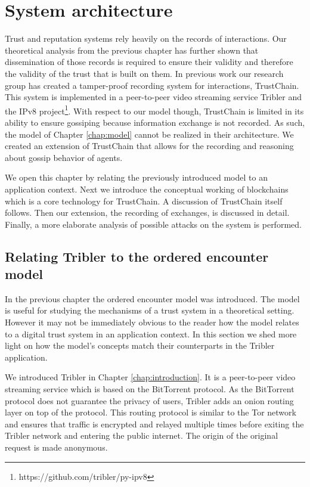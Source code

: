 \chapter{System architecture}
\label{chap:implementation}

Trust and reputation systems rely heavily on the records of interactions. Our theoretical analysis from
the previous chapter has further shown that dissemination of those records is required to ensure their
validity and therefore the validity of the trust that is built on them. In previous work our 
research group has created a tamper-proof recording system for interactions, TrustChain. This system is 
implemented in a peer-to-peer video streaming service Tribler and the IPv8 project\footnote{https://github.com/tribler/py-ipv8}.
With respect to our model though, TrustChain is limited in its ability to ensure gossiping because information
exchange is not recorded.
As such, the model of Chapter \ref{chap:model}
cannot be realized in their architecture. We created an extension of TrustChain that allows for the 
recording and reasoning about gossip behavior of agents.

We open this chapter by relating the previously introduced model to an application context. Next we
introduce the conceptual working of blockchains which is a core technology for TrustChain. A discussion of
TrustChain itself follows. Then our extension, the recording of exchanges, is discussed in detail. 
Finally, a more elaborate analysis of possible attacks on the system is performed.

\section{Relating Tribler to the ordered encounter model}
In the previous chapter the ordered encounter model was introduced. The model is useful for studying 
the mechanisms of a trust system in a theoretical 
setting. However it may not be immediately obvious to the reader how the model relates to a digital
trust system in an application context. In this section we shed more light on how the model's concepts 
match their counterparts in the Tribler application.

We introduced Tribler in Chapter \ref{chap:introduction}. It is a peer-to-peer video streaming 
service which is based on the BitTorrent protocol. As the BitTorrent protocol does not guarantee the
privacy of users, Tribler adds an onion routing layer on top of the protocol. This routing protocol 
is similar to the Tor network and ensures that traffic is encrypted and relayed multiple times before exiting the
Tribler network and entering the public internet. The origin of the original request is made anonymous.

